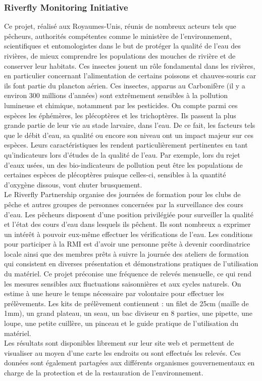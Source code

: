 \documentclass[10pt, article]{llncs}
\begin{document}
		\subsubsection{Riverfly Monitoring Initiative}
			Ce projet, réalisé aux Royaumes-Unis, réunis de nombreux acteurs tels que pêcheurs, authorités compétentes comme le ministère de l'environnement, scientifiques et entomologistes dans le but de protéger la qualité de l'eau des rivières, de mieux comprendre les populations des mouches de rivière et de conserver leur habitats. Ces insectes jouent un rôle fondamental dans les rivières, en particulier concernant l'alimentation de certains poissons et chauves-souris car ils font partie du plancton aérien. Ces insectes, apparus au Carbonifère (il y a environ 300 millions d'années) sont extrêmement sensibles à la pollution lumineuse et chimique, notamment par les pesticides. On compte parmi ces espèces les éphémères, les plécoptères et les trichoptères. Ils passent la plus grande partie de leur vie au stade larvaire, dans l'eau. De ce fait, les facteurs tels que le débit d'eau, sa qualité ou encore son niveau ont un impact majeur sur ces espèces. Leurs caractéristiques les rendent particulièrement pertinentes en tant qu'indicateurs lors d'études de la qualité de l'eau. Par exemple, lors du rejet d'eaux usées, un des bio-indicateurs de pollution peut être les populations de certaines espèces de plécoptères puisque celles-ci, sensibles à la quantité d'oxygène dissous, vont chuter brusquement. \\
			Le Riverfly Partnership organise des journées de formation pour les clubs de pêche et autres groupes de personnes concernées par la surveillance des cours d'eau. Les pêcheurs disposent d'une position privilégiée pour surveiller la qualité et l'état des cours d'eau dans lesquels ils pêchent. Ils sont nombreux a exprimer un intérêt à pouvoir eux-même effectuer les vérifications de l'eau. Les conditions pour participer à la RMI est d'avoir une personne prête à devenir coordinatrice locale ainsi que des membres prêts à suivre la journée des ateliers de formation qui consistent en diverses présentation et démonstrations pratiques de l'utilisation du matériel. 
			Ce projet préconise une fréquence de relevés mensuelle, ce qui rend les mesures sensibles aux fluctuations saisonnières et aux cycles naturels. On estime à une heure le temps nécessaire par volontaire pour effectuer les prélèvements. Les kits de prélèvement contiennent : un filet de 25cm (maille de 1mm), un grand plateau, un seau, un bac diviseur en 8 parties, une pipette, une loupe, une petite cuillère, un pinceau et le guide pratique de l'utilisation du matériel.\\
			Les résultats sont disponibles librement sur leur site web et permettent de visualiser au moyen d'une carte les endroits ou sont effectués les relevés. Ces données sont également partagées aux différents organismes gouvernementaux en charge de la protection et de la restauration de  l'environnement.
		
\end{document}
